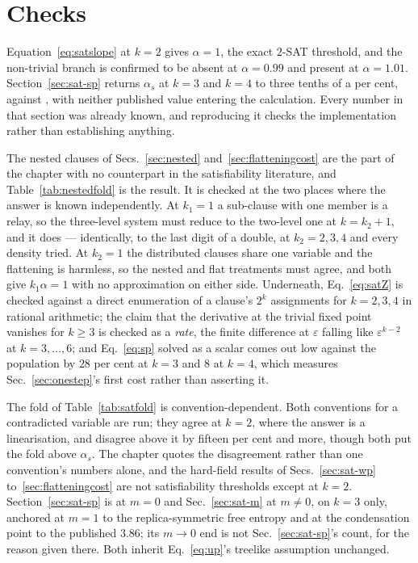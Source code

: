 \section{Checks}
\label{sec:sat-checks}

Equation~\eqref{eq:satslope} at $k=2$ gives $\alpha=1$, the exact $2$-SAT
threshold, and the non-trivial branch is confirmed to be absent at
$\alpha=0.99$ and present at $\alpha=1.01$. Section~\ref{sec:sat-sp} returns
$\alpha_{s}$ at $k=3$ and $k=4$ to three tenths of a per cent, against
\citet{montanari2008}, with neither published value entering the calculation.
Every number in that section was already known, and reproducing it checks the
implementation rather than establishing anything.

The nested clauses of Secs.~\ref{sec:nested} and~\ref{sec:flatteningcost} are
the part of the chapter with no counterpart in the satisfiability literature,
and Table~\ref{tab:nestedfold} is the result. It is checked at the two places
where the answer is known independently. At $k_{1}=1$ a sub-clause with one
member is a relay, so the three-level system must reduce to the two-level one at
$k=k_{2}+1$, and it does --- identically, to the last digit of a double, at
$k_{2}=2,3,4$ and every density tried. At $k_{2}=1$ the distributed clauses
share one variable and the flattening is harmless, so the nested and flat
treatments must agree, and both give $k_{1}\alpha=1$ with no approximation on
either side. Underneath, Eq.~\eqref{eq:satZ} is checked against a direct
enumeration of a clause's $2^{k}$ assignments for $k=2,3,4$ in rational
arithmetic; the claim that the derivative at the trivial fixed point vanishes
for $k\ge3$ is checked as a \emph{rate}, the finite difference at $\varepsilon$
falling like $\varepsilon^{k-2}$ at $k=3,\dots,6$; and Eq.~\eqref{eq:sp} solved
as a scalar comes out low against the population by $28$ per cent at $k=3$ and
$8$ at $k=4$, which measures Sec.~\ref{sec:onestep}'s first cost rather than
asserting it.

The fold of Table~\ref{tab:satfold} is convention-dependent. Both conventions
for a contradicted variable are run; they agree at $k=2$, where the answer is a
linearisation, and disagree above it by fifteen per cent and more, though both
put the fold above $\alpha_{s}$. The chapter quotes the disagreement rather than
one convention's numbers alone, and the hard-field results of
Secs.~\ref{sec:sat-wp} to~\ref{sec:flatteningcost} are not satisfiability
thresholds except at $k=2$. Section~\ref{sec:sat-sp} is at $m=0$ and Sec.~\ref{sec:sat-m} at
$m\ne0$, on $k=3$ only, anchored at $m=1$ to the replica-symmetric free
entropy and at the condensation point to the published $3.86$; its $m\to0$
end is not Sec.~\ref{sec:sat-sp}'s count, for the reason given there. Both
inherit Eq.~\eqref{eq:up}'s treelike assumption unchanged.
